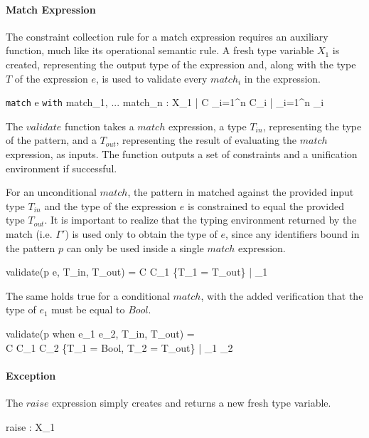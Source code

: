 \documentclass[class=article, crop=false]{standalone}
\begin{document}
\paragraph{Match Expression}

The constraint collection rule for a match expression requires an auxiliary function, much like its operational semantic rule.
A fresh type variable $X_1$ is created, representing the output type of the expression and, along with the type $T$ of the expression $e$, is used to validate every $match_i$ in the expression.

    {\Gamma \vdash \texttt{match} \; e \; \texttt{with} \; match_1, ... \; match_n : X_1 \; | \; C \cup \displaystyle \bigcup_{i=1}^{n} C_i \; | \; \gamma \cup \displaystyle \bigcup_{i=1}^{n} \gamma_i}

\medskip

The $validate$ function takes a $match$ expression, a type $T_{in}$, representing the type of the pattern, and a $T_{out}$, representing the result of evaluating the $match$ expression, as inputs.
The function outputs a set of constraints and a unification environment if successful.

For an unconditional $match$, the pattern in matched against the provided input type $T_{in}$ and the type of the expression $e$ is constrained to equal the provided type $T_{out}$.
It is important to realize that the typing environment returned by the match (i.e. $\Gamma'$) is used only to obtain the type of $e$, since any identifiers bound in the pattern $p$ can only be used inside a single $match$ expression.

  {\Gamma \vdash validate(p \rightarrow e, T_{in}, T_{out}) = C \cup C_1 \cup \{T_1 = T_{out}\} \; | \; \gamma_1}

The same holds true for a conditional $match$, with the added verification that the type of $e_1$ must be equal to $Bool$.

  {\Gamma \vdash validate(p \; \mbox{when} \; e_1 \rightarrow e_2, T_{in}, T_{out}) =\\
  C \cup C_1 \cup C_2 \cup \{T_1 = Bool, T_2 = T_{out}\} \; | \; \gamma_1 \cup \gamma_2}

\paragraph{Exception}

The $raise$ expression simply creates and returns a new fresh type variable.

    {\Gamma \vdash raise : X_1}
\end{document}
